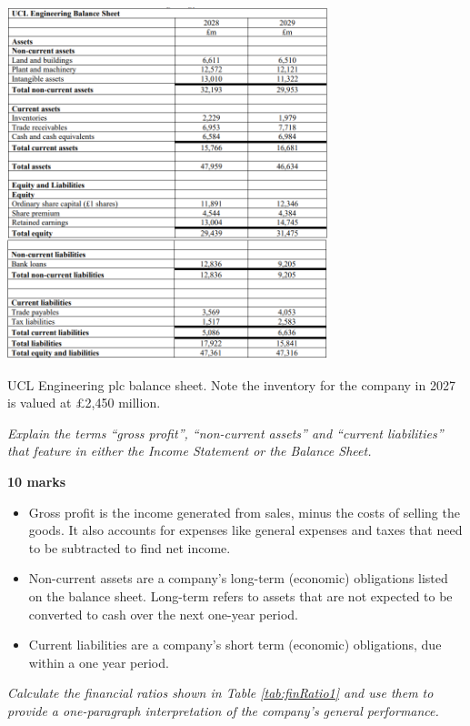 \begin{table}[H]
    \centering
    \includegraphics[width = 0.7\textwidth]{img/figure67.png}
    \caption{UCL Engineering plc balance sheet.  Note the inventory for the company in 2027 is valued at \pounds 2,450 million.}
    \label{tab:balSheet1}
\end{table}
\newpage
\textit{Explain the terms ``gross profit'', ``non-current assets'' and ``current liabilities'' that feature in either the Income Statement or the Balance Sheet.}

\textbf{10 marks}
\begin{itemize}
    \item Gross profit is the income generated from sales, minus the costs of selling the goods. It also accounts for expenses like general expenses and taxes that need to be subtracted to find net income.
    \item Non-current assets are a company's long-term (economic) obligations listed on the balance sheet. Long-term refers to assets that are not expected to be converted to cash over the next one-year period.
    \item Current liabilities are a company's short term (economic) obligations, due within a one year period.
\end{itemize}
\textit{Calculate the financial ratios shown in Table \ref{tab:finRatio1} and use them to provide a one-paragraph interpretation of the company's general performance.}

